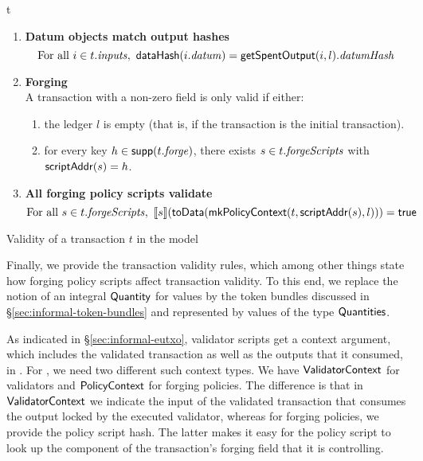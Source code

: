 \begin{ruledfigure}{t}
\begin{enumerate}
\item
  \label{rule:datum-objects-hash}
  \textbf{Datum objects match output hashes}
  \begin{displaymath}
    \textrm{For all } i \in t.\mathit{inputs},\ \mathsf{dataHash}(i.\mathit{datum}) = \mathsf{getSpentOutput}(i, l).\mathit{datumHash}
  \end{displaymath}

\item
  \label{rule:forging}
  \textbf{Forging}\\
  A transaction with a non-zero \forge{} field is only
  valid if either:
  \begin{enumerate}
  \item the ledger $l$ is empty (that is, if the transaction is the initial transaction).
  \item \label{rule:custom-forge}
    for every key $h \in \mathsf{supp}(t.\mathit{forge})$, there
    exists $s \in t.\mathit{forgeScripts}$ with
    $\mathsf{scriptAddr}(s) = h$.
  \end{enumerate}
\medskip %
\item
  \label{rule:all-mpss-run}
  \textbf{All forging policy scripts validate}
  \begin{displaymath}
    \textrm{For all } s \in t.\forgeScripts,\ \applyMPScript{s}(\toData(\mkMpsContext(t, \scriptAddr(s), l))) = \true
  \end{displaymath}

\end{enumerate}
\caption{Validity of a transaction $t$ in the \EUTXOma{} model}
\label{fig:validity}
\end{ruledfigure}
%
Finally, we provide the transaction validity rules, which among other things state how forging policy scripts affect transaction validity. To this end, we replace the notion of an integral $\textsf{Quantity}$ for values by the token bundles discussed in \S\ref{sec:informal-token-bundles} and represented by values of the type $\textsf{Quantities}$.

As indicated in \S\ref{sec:informal-eutxo}, validator scripts get a context argument, which includes the validated transaction as well as the outputs that it consumed, in \EUTXO. For \EUTXOma, we need two different such context types. We have $\textsf{ValidatorContext}$ for validators and $\textsf{PolicyContext}$ for forging policies. The difference is that in $\textsf{ValidatorContext}$ we indicate the input of the validated transaction that consumes the output locked by the executed validator, whereas for forging policies, we provide the policy script hash. The latter makes it easy for the policy script to look up the component of the transaction's forging field that it is controlling.

